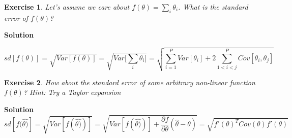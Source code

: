 \documentclass[twoside]{article}
\newcounter{lecnum}
\newtheorem{exercise}{Exercise}[lecnum]
\begin{document}
\begin{exercise}
  Let's assume we care about $f(\theta) = \sum_i \theta_i$. What is the standard error of $f(\theta)$?
\end{exercise}

\color{blue}
\textbf{Solution}

$$ sd [f(\theta)] = \sqrt{Var[f(\theta)]} =  \sqrt{Var\bigg[\sum_i \theta_i\bigg]} =
 \sqrt{  \sum_{i=1}^{P} Var [\theta_i] + 2 \sum_{1 < i<j}^{P} Cov [\theta_i, \theta_j]  } $$

\color{black}


\begin{exercise}
  How about the standard error of some arbitrary non-linear function $f(\theta)$? \textit{Hint: Try a Taylor expansion}
\end{exercise}

\color{blue}
\textbf{Solution}
$$
sd [f(\hat {\theta)}] = \sqrt{Var[f(\hat {\theta)})]} =  \sqrt{Var[f(\hat {\theta)})] +  
	\frac{\partial f}{\partial \theta } (\hat {\theta} - \theta)  } =
\sqrt{ f'(\theta)^T Cov(\theta) f'(\theta) } 
$$

\color{black}
\end{document}
